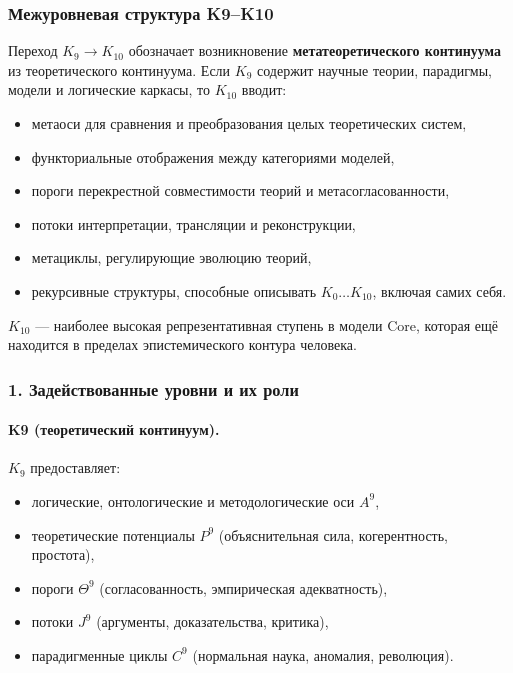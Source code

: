 
\subsubsection{Межуровневая структура K9–K10}
\label{sec:crossk-k9-k10}

Переход $K_9 \rightarrow K_{10}$ обозначает возникновение
\textbf{метатеоретического континуума} из теоретического континуума. Если
$K_9$ содержит научные теории, парадигмы, модели и логические каркасы, то
$K_{10}$ вводит:
\begin{itemize}
  \item метаоси для сравнения и преобразования целых теоретических систем,
  \item функториальные отображения между категориями моделей,
  \item пороги перекрестной совместимости теорий и метасогласованности,
  \item потоки интерпретации, трансляции и реконструкции,
  \item метациклы, регулирующие эволюцию теорий,
  \item рекурсивные структуры, способные описывать $K_0 \dots K_{10}$,
        включая самих себя.
\end{itemize}

$K_{10}$ — наиболее высокая репрезентативная ступень в модели Core, которая
ещё находится в пределах эпистемического контура человека.

\subsubsection{1. Задействованные уровни и их роли}

\paragraph{K9 (теоретический континуум).}
$K_9$ предоставляет:
\begin{itemize}
  \item логические, онтологические и методологические оси $A^9$,
  \item теоретические потенциалы $P^9$ (объяснительная сила, когерентность,
        простота),
  \item пороги $\Theta^9$ (согласованность, эмпирическая адекватность),
  \item потоки $J^9$ (аргументы, доказательства, критика),
  \item парадигменные циклы $C^9$ (нормальная наука, аномалия, революция).
\end{itemize}

